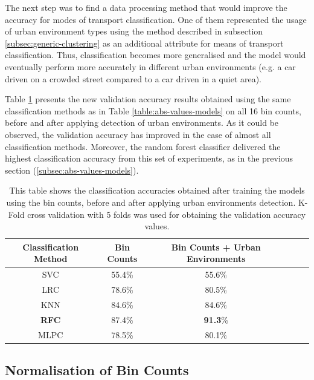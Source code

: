 \documentclass[bsc,frontabs,twoside,singlespacing, parskip,deptreport]{infthesis}     %
\begin{document}
The next step was to find a data processing method that would improve the accuracy for modes of transport classification. One of them represented the usage of urban environment types using the method described in subsection \ref{subsec:generic-clustering} as an additional attribute for means of transport classification. Thus, classification becomes more generalised and the model would eventually perform more accurately in different urban environments (e.g. a car driven on a crowded street compared to a car driven in a quiet area).

Table \ref{table:urban-env-models} presents the new validation accuracy results obtained using the same classification methods as in Table \ref{table:abs-values-models} on all 16 bin counts, before and after applying detection of urban environments. As it could be observed, the validation accuracy has improved in the case of almost all classification methods. Moreover, the random forest classifier delivered the highest classification accuracy from this set of experiments, as in the previous section (\ref{subsec:abs-values-models}).

\begin{table}[h!]
\centering
 \begin{tabular}{||c | c | c | c | c | c||} 
 \hline
 Classification Method & Bin Counts & Bin Counts + Urban Environments \\ [0.5ex] 
 \hline\hline
 SVC & 55.4\% & 55.6\% \\ 
 \hline
 LRC & 78.6\% & 80.5\% \\
 \hline
 KNN & 84.6\% & 84.6\% \\ 
 \hline
 \textbf{RFC} & 87.4\% & \textbf{91.3}\% \\ 
 \hline
  MLPC & 78.5\% & 80.1\% \\ 
 \hline
\end{tabular}
\caption{This table shows the classification accuracies obtained after training the models using the bin counts, before and after applying urban environments detection. K-Fold cross validation with 5 folds was used for obtaining the validation accuracy values.}
\label{table:urban-env-models}
\end{table}


\subsection{Normalisation of Bin Counts}
\label{subsec:norm-bin-counts-results}
\end{document}
